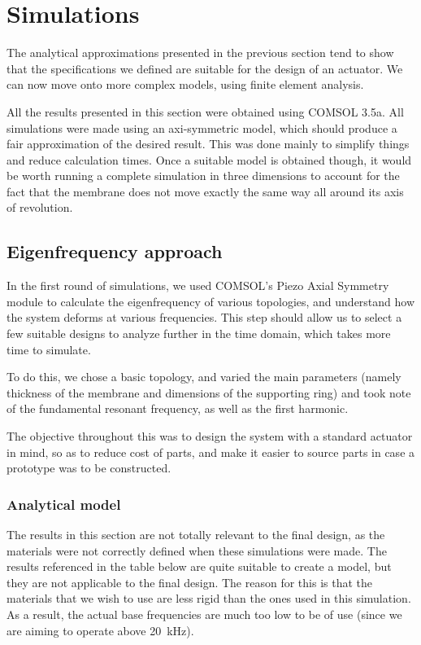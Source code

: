 \section{Simulations}

The analytical approximations presented in the previous section tend to show
that the specifications we defined are suitable for the design of an actuator.
We can now move onto more complex models, using finite element analysis. 

All the results presented in this section were obtained using COMSOL 3.5a. All
simulations were made using an axi-symmetric model, which should produce a fair
approximation of the desired result. This was done mainly to simplify things and
reduce calculation times. Once a suitable model is obtained though, it would be
worth running a complete simulation in three dimensions to account for the fact
that the membrane does not move exactly the same way all around its axis of
revolution.

\subsection{Eigenfrequency approach}

In the first round of simulations, we used COMSOL's Piezo Axial Symmetry module
to calculate the eigenfrequency of various topologies, and understand how the
system deforms at various frequencies. This step should allow us to select a few
suitable designs to analyze further in the time domain, which takes more time to
simulate.

To do this, we chose a basic topology, and varied the main parameters (namely
thickness of the membrane and dimensions of the supporting ring) and took note
of the fundamental resonant frequency, as well as the first harmonic.

The objective throughout this was to design the system with a standard actuator
in mind, so as to reduce cost of parts, and make it easier to source parts in
case a prototype was to be constructed.

\subsubsection{Analytical model}

The results in this section are not totally relevant to the final design, as the
materials were not correctly defined when these simulations were made. The
results referenced in the table below are quite suitable to create a model, but
they are not applicable to the final design. The reason for this is that the
materials that we wish to use are less rigid than the ones used in this
simulation. As a result, the actual base frequencies are much too low to be of
use (since we are aiming to operate above \SI{20}{\kilo\hertz}).

